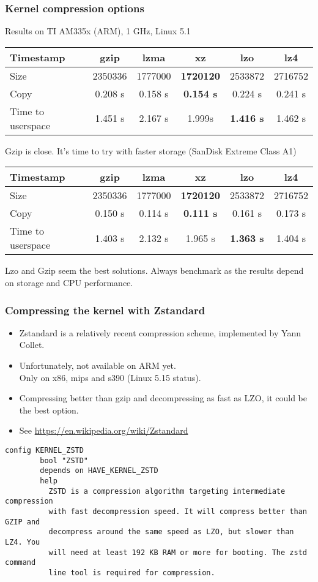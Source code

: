 \begin{frame}
\frametitle{Kernel compression options}
Results on TI AM335x (ARM), 1 GHz, Linux 5.1
{\fontsize{7}{10}\selectfont
\begin{tabular}{| l || c | c | c | c | c |}
\hline
Timestamp & gzip & lzma & xz & lzo & lz4 \\
\hline
Size & 2350336 & 1777000 & {\bf 1720120} & 2533872 & 2716752 \\
Copy & 0.208 s & 0.158 s & {\bf 0.154 s} & 0.224 s & 0.241 s \\
Time to userspace & 1.451 s & 2.167 s & 1.999s & {\bf 1.416 s} & 1.462 s \\
\hline
\end{tabular}
}
\vfill{}
Gzip is close. It's time to try with faster storage (SanDisk Extreme
Class A1)
{\fontsize{7}{10}\selectfont
\begin{tabular}{| l || c | c | c | c | c |}
\hline
Timestamp & gzip & lzma & xz & lzo & lz4 \\
\hline
Size & 2350336 & 1777000 & {\bf 1720120} & 2533872 & 2716752 \\
Copy & 0.150 s & 0.114 s & {\bf 0.111 s} & 0.161 s & 0.173 s \\
Time to userspace & 1.403 s & 2.132 s & 1.965 s & {\bf 1.363 s} & 1.404 s \\
\hline
\end{tabular}
}
\newline\newline
Lzo and Gzip seem the best solutions. Always benchmark as the results
depend on storage and CPU performance.
\end{frame}

\begin{frame}[fragile]
\frametitle{Compressing the kernel with Zstandard}
\begin{itemize}
  \item Zstandard is a relatively recent compression scheme, implemented
        by Yann Collet.
  \item Unfortunately, not available on ARM yet.\\
        Only on x86, mips and s390 (Linux 5.15 status).
  \item Compressing better than gzip and decompressing as fast as LZO,
        it could be the best option.
  \item See \url{https://en.wikipedia.org/wiki/Zstandard}
\end{itemize}
\begin{block}{}
\small
\begin{verbatim}
config KERNEL_ZSTD
        bool "ZSTD"
        depends on HAVE_KERNEL_ZSTD
        help
          ZSTD is a compression algorithm targeting intermediate compression
          with fast decompression speed. It will compress better than GZIP and
          decompress around the same speed as LZO, but slower than LZ4. You
          will need at least 192 KB RAM or more for booting. The zstd command
          line tool is required for compression.
\end{verbatim}
\end{block}
\end{frame}

